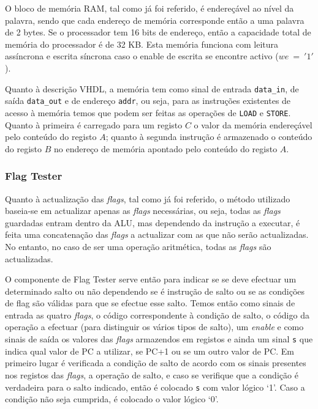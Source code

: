 \documentclass[a4paper]{article}
\begin{document}
				O bloco de memória RAM, tal como já foi referido, é endereçável ao nível da palavra, sendo que cada endereço de memória corresponde então a uma palavra de 2 bytes. Se o processador tem 16 bits de endereço, então a capacidade total de memória do processador é de 32 KB. Esta memória funciona com leitura assíncrona e escrita síncrona caso o enable de escrita se encontre activo ($we~=~'1'$).
				
				Quanto à descrição VHDL, a memória tem como sinal de entrada \texttt{data\_in}, de saída \texttt{data\_out} e de endereço \texttt{addr}, ou seja, para as instruções existentes de acesso à memória temos que podem ser feitas as operações de \texttt{LOAD} e \texttt{STORE}. Quanto à primeira é carregado para um registo $C$ o valor da memória endereçável pelo conteúdo do registo $A$; quanto à segunda instrução é armazenado o conteúdo do registo $B$ no endereço de memória apontado pelo conteúdo do registo $A$.
				
			\subsubsection{Flag Tester}
			
				Quanto à actualização das \textit{flags}, tal como já foi referido, o método utilizado baseia-se em actualizar apenas as \textit{flags} necessárias, ou seja, todas as \textit{flags} guardadas entram dentro da ALU, mas dependendo da instrução a executar, é feita uma concatenação das \textit{flags} a actualizar com as que não serão actualizadas. No entanto, no caso de ser uma operação aritmética, todas as \textit{flags} são actualizadas.
			
				O componente de Flag Tester serve então para indicar se se deve efectuar um determinado salto ou não dependendo se é instrução de salto ou se as condições de flag são válidas para que se efectue esse salto. Temos então como sinais de entrada as quatro \textit{flags}, o código correspondente à condição de salto, o código da operação a efectuar (para distinguir os vários tipos de salto), um \textit{enable} e como sinais de saída os valores das \textit{flags} armazendos em registos e ainda um sinal \texttt{s} que indica qual valor de PC a utilizar, se PC+1 ou se um outro valor de PC. Em primeiro lugar é verificada a condição de salto de acordo com os sinais presentes nos registos das \textit{flags}, a operação de salto, e caso se verifique que a condição é verdadeira para o salto indicado, então é colocado \texttt{s} com valor lógico `1'. Caso a condição não seja cumprida, é colocado o valor lógico `0'. 
				
\end{document}
